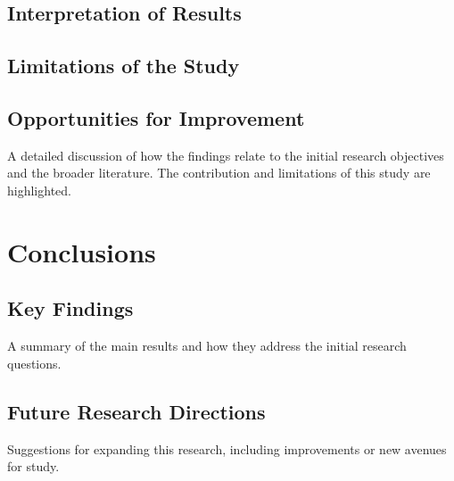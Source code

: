 \documentclass[a4paper,12pt]{report}
\begin{document}
\section{Interpretation of Results}

\section{Limitations of the Study}

\section{Opportunities for Improvement}


A detailed discussion of how the findings relate to the initial research objectives and the broader literature. The contribution and limitations of this study are highlighted.

\chapter{Conclusions}

\section{Key Findings}
A summary of the main results and how they address the initial research questions.

\section{Future Research Directions}
Suggestions for expanding this research, including improvements or new avenues for study.
\end{document}
